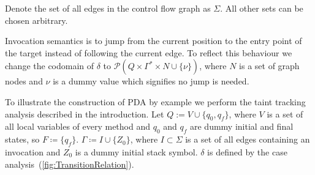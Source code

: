 Denote the set of all edges in the control flow graph as $\Sigma$.
All other sets can be chosen arbitrary.

Invocation semantics is to jump from the current position to the entry point of the target instead of following the current edge.
To reflect this behaviour we change the codomain of $\delta$ to $\mathcal P (Q \times \Gamma^* \times N \cup \{\nu\})$, where $N$ is a set of graph nodes and $\nu$ is a dummy value which signifies no jump is needed.

To illustrate the construction of PDA by example we perform the taint tracking analysis described in the introduction.
Let $Q := V \cup \{q_0, q_f\}$, where $V$ is a set of all local variables of every method and $q_0$ and $q_f$ are dummy initial and final states, so $F \coloneqq \{q_f\}$.
$\Gamma \coloneqq I \cup \{Z_0\}$, where $I \subset \Sigma$ is a set of all edges containing an invocation and $Z_0$ is a dummy initial stack symbol.
$\delta$ is defined by the case analysis~(\ref{fig:TransitionRelation}).
